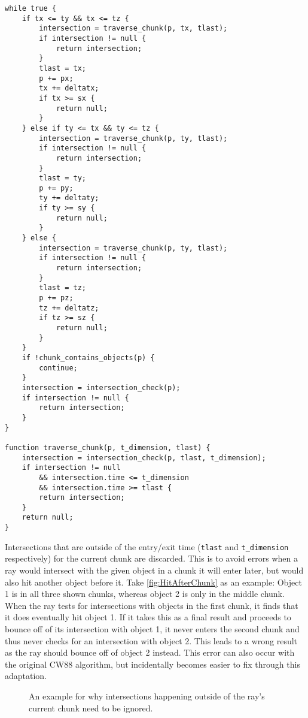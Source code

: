 \begin{lstlisting}[basicstyle=\small, caption={[Adapted CW88 algorithm]The adapted version of CW88 for time-based chunks.}, label={lst:alteredCW88}]
while true {
    if tx <= ty && tx <= tz {
        intersection = traverse_chunk(p, tx, tlast);
        if intersection != null {
            return intersection;
        }
        tlast = tx;
        p += px;
        tx += deltatx;
        if tx >= sx {
            return null;
        }
    } else if ty <= tx && ty <= tz {
        intersection = traverse_chunk(p, ty, tlast);
        if intersection != null {
            return intersection;
        }
        tlast = ty;
        p += py;
        ty += deltaty;
        if ty >= sy {
            return null;
        }
    } else {
        intersection = traverse_chunk(p, ty, tlast);
        if intersection != null {
            return intersection;
        }
        tlast = tz;
        p += pz;
        tz += deltatz;
        if tz >= sz {
            return null;
        }
	}
    if !chunk_contains_objects(p) {
        continue;
    }
    intersection = intersection_check(p);
    if intersection != null {
        return intersection;
    }
}

function traverse_chunk(p, t_dimension, tlast) {
    intersection = intersection_check(p, tlast, t_dimension);
    if intersection != null 
        && intersection.time <= t_dimension
        && intersection.time >= tlast {
        return intersection;
    }
    return null;
}
\end{lstlisting}
Intersections that are outside of the entry/exit time (\verb|tlast| and \verb|t_dimension| respectively) for the current chunk are discarded.
This is to avoid errors when a ray would intersect with the given object in a chunk it will enter later,
but would also hit another object before it.
Take \autoref{fig:HitAfterChunk} as an example:
Object 1 is in all three shown chunks, whereas object 2 is only in the middle chunk.
When the ray tests for intersections with objects in the first chunk,
it finds that it does eventually hit object 1.
If it takes this as a final result and proceeds to bounce off of its intersection with object 1,
it never enters the second chunk and thus never checks for an intersection with object 2.
This leads to a wrong result as the ray should bounce off of object 2 instead.
This error can also occur with the original CW88 algorithm,
but incidentally becomes easier to fix through this adaptation.
\begin{figure}[t!]
    
    \caption[Demonstration of why only intersections inside a chunk are counted]{An example for why intersections happening outside of the ray's current chunk need to be ignored.}\label{fig:HitAfterChunk}
\end{figure}
